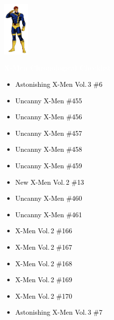 \documentclass[12pt]{article}
\newcommand{\checkbox}{\raisebox{0.0ex}{\fbox{\rule{0ex}{1.5ex} \rule{1.5ex}{0ex}}}}
\begin{document}
\begin{center}
    \vspace*{2cm}
    \includegraphics[width=0.1\textwidth]{cyclops.png}
    \vspace{0.3cm}

    {\Huge \textbf{\textcolor{white}{X-Men Chronological Checklist}}}
\end{center}

\vspace{0.3cm}
\noindent
\begin{tcolorbox}[
  colback=white!95!gray,
  colframe=black,
  width=\textwidth,
  arc=4mm,
  auto outer arc,
  boxrule=0.8pt,
  left=8pt,right=8pt,top=8pt,bottom=8pt
]
\begin{itemize}[left=0pt,label={\checkbox}]
  \item \textcolor{black}{Astonishing X-Men Vol.\,3 \#6}
  \item \textcolor{black}{Uncanny X-Men \#455}
  \item \textcolor{black}{Uncanny X-Men \#456}
  \item \textcolor{black}{Uncanny X-Men \#457}
  \item \textcolor{black}{Uncanny X-Men \#458}
  \item \textcolor{black}{Uncanny X-Men \#459}
  \item \textcolor{black}{New X-Men Vol.\,2 \#13}
  \item \textcolor{black}{Uncanny X-Men \#460}
  \item \textcolor{black}{Uncanny X-Men \#461}
  \item \textcolor{black}{X-Men Vol.\,2 \#166}
  \item \textcolor{black}{X-Men Vol.\,2 \#167}
  \item \textcolor{black}{X-Men Vol.\,2 \#168}
  \item \textcolor{black}{X-Men Vol.\,2 \#169}
  \item \textcolor{black}{X-Men Vol.\,2 \#170}
  \item \textcolor{black}{Astonishing X-Men Vol.\,3 \#7}
\end{itemize}
\end{tcolorbox}
\end{document}
